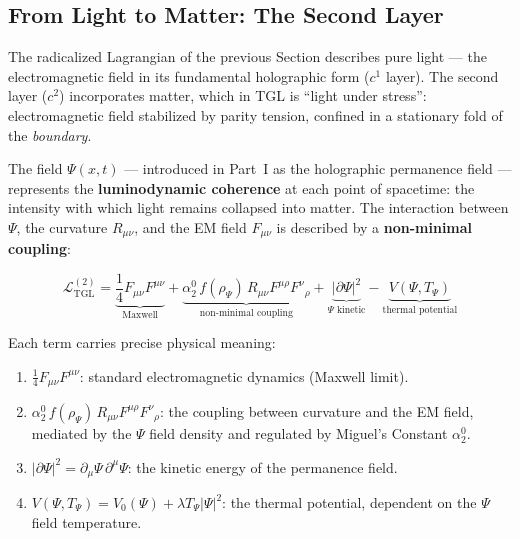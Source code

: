\documentclass[12pt,a4paper,twoside]{article}
\newcommand{\Psifield}{\Psi}
\newcommand{\boundary}{\textit{boundary}}
\begin{document}
\subsection{From Light to Matter: The Second Layer}

The radicalized Lagrangian of the previous Section describes pure light --- the electromagnetic field in its fundamental holographic form ($c^1$ layer). The second layer ($c^2$) incorporates matter, which in TGL is ``light under stress'': electromagnetic field stabilized by parity tension, confined in a stationary fold of the \boundary.



The field $\Psifield(x,t)$ --- introduced in Part~I as the holographic permanence field --- represents the \textbf{luminodynamic coherence} at each point of spacetime: the intensity with which light remains collapsed into matter. The interaction between $\Psifield$, the curvature $R_{\mu\nu}$, and the EM field $F_{\mu\nu}$ is described by a \textbf{non-minimal coupling}:

\begin{equationbox}[title={$\Psifield$-Coupled Lagrangian}]
\begin{equation}
\boxed{\mathcal{L}_{\text{TGL}}^{(2)} = \underbrace{\frac{1}{4}F_{\mu\nu}F^{\mu\nu}}_{\text{Maxwell}} + \underbrace{\alpha_2^{0}\, f(\rho_\Psifield)\, R_{\mu\nu}F^{\mu\rho}F^{\nu}{}_{\rho}}_{\text{non-minimal coupling}} + \underbrace{|\partial\Psifield|^2}_{\Psifield\text{ kinetic}} - \underbrace{V(\Psifield, T_\Psifield)}_{\text{thermal potential}}}
\label{eq:lagrangian_psi}
\end{equation}
\end{equationbox}

Each term carries precise physical meaning:
\begin{enumerate}[nosep]
\item $\frac{1}{4}F_{\mu\nu}F^{\mu\nu}$: standard electromagnetic dynamics (Maxwell limit).
\item $\alpha_2^{0}\, f(\rho_\Psifield)\, R_{\mu\nu}F^{\mu\rho}F^{\nu}{}_{\rho}$: the coupling between curvature and the EM field, mediated by the $\Psifield$ field density and regulated by Miguel's Constant $\alpha_2^0$.
\item $|\partial\Psifield|^2 = \partial_\mu\Psifield\,\partial^\mu\Psifield$: the kinetic energy of the permanence field.
\item $V(\Psifield, T_\Psifield) = V_0(\Psifield) + \lambda T_\Psifield |\Psifield|^2$: the thermal potential, dependent on the $\Psifield$ field temperature.
\end{enumerate}
\end{document}
